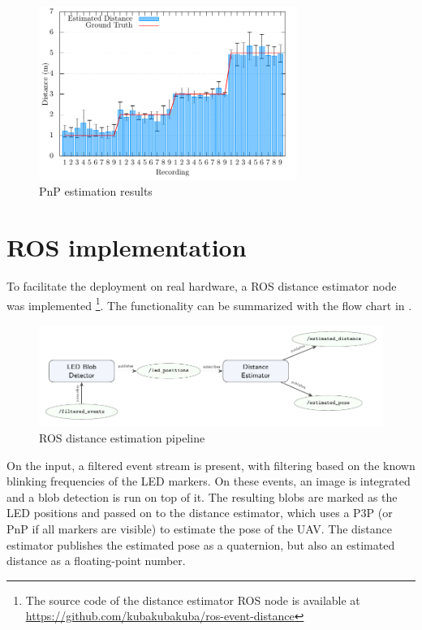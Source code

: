 \begin{figure}[H]
	\centering
	\includegraphics[width=0.75\textwidth]{./fig/tikz/pnp_results.pdf}
	\caption{PnP estimation results}
	\label{fig:pnpres}
\end{figure}

\section{ROS implementation}
To facilitate the deployment on real hardware, a \ac{ROS} distance estimator node was implemented
\footnote{The source code of the distance estimator \ac{ROS} node is available at \url{https://github.com/kubakubakuba/ros-event-distance}}.
The functionality can be summarized with the flow chart 
in
.
\begin{figure}[H]
	\centering
	\includegraphics[width=1.0\textwidth]{./fig/tikz/rosflow.pdf}
	\caption{ROS distance estimation pipeline}
	\label{fig:rosflow}
\end{figure}
On the input, a filtered event stream is present, with filtering based on the known blinking frequencies of the \ac{LED} markers.
On these events, an image is integrated and a blob detection is run on top of it. The resulting blobs are marked as the \ac{LED} positions and passed 
on to the distance estimator, which uses a \ac{P3P} (or \ac{PnP} if all markers are visible) to estimate the pose of the \ac{UAV}. The distance estimator publishes the estimated pose as a quaternion, but also an estimated distance as a floating-point number.